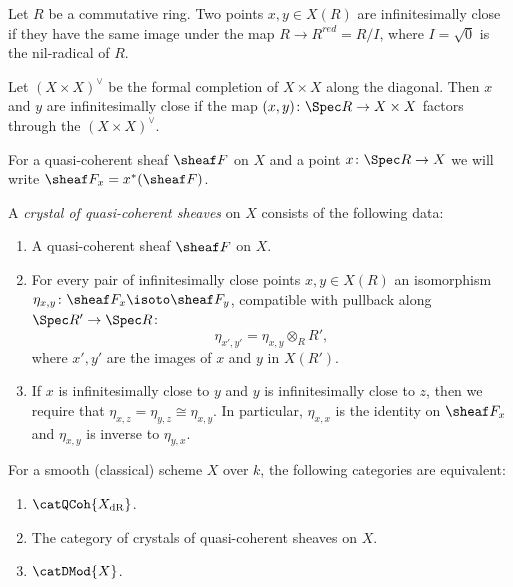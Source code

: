 \documentclass{ck-article}
\newcommand\dR{{\mathrm{dR}}}
\begin{document}
\begin{Def}
    Let $R$ be a commutative ring.
    Two points $x, y \in X(R)$ are infinitesimally close if they have the same image under the map $R \to R^{red} = R/I$, where $I = \sqrt{0}$ is the nil-radical of $R$.
\end{Def}

Let $(X \times X)^\vee$ be the formal completion of $X \times X$ along the diagonal.
Then $x$ and $y$ are infinitesimally close if the map $(x,y) \colon \Spec R \to X \times X$ factors through the $(X \times X)^\vee$.

For a quasi-coherent sheaf $\sheaf F$ on $X$ and a point $x\colon \Spec R \to X$ we will write $\sheaf F_x = x^*(\sheaf F)$.

\begin{Def}
    A \emph{crystal of quasi-coherent sheaves} on $X$ consists of the following data:
    \begin{enumerate}
        \item A quasi-coherent sheaf $\sheaf F$ on $X$.
        \item For every pair of infinitesimally close points $x,y \in X(R)$ an isomorphism $\eta_{x,y}\colon \sheaf F_x \isoto \sheaf F_y$, compatible with pullback along $\Spec R' \to \Spec R$:
            \[
                \eta_{x',y'} = \eta_{x,y} \otimes_R R',
            \]
            where $x',y'$ are the images of $x$ and $y$ in $X(R')$.
        \item If $x$ is infinitesimally close to $y$ and $y$ is infinitesimally close to $z$, then we require that $\eta_{x,z} = \eta_{y,z} \cong \eta_{x,y}$.
            In particular, $\eta_{x,x}$ is the identity on $\sheaf F_x$ and $\eta_{x,y}$ is inverse to $\eta_{y,x}$.
    \end{enumerate}
\end{Def}

\begin{Prop}
    For a smooth (classical) scheme $X$ over $k$, the following categories are equivalent:
    \begin{enumerate}
        \item $\catQCoh{X_{\dR}}$.
        \item The category of crystals of quasi-coherent sheaves on $X$.
        \item $\catDMod{X}$.
    \end{enumerate}
\end{Prop}
\end{document}
